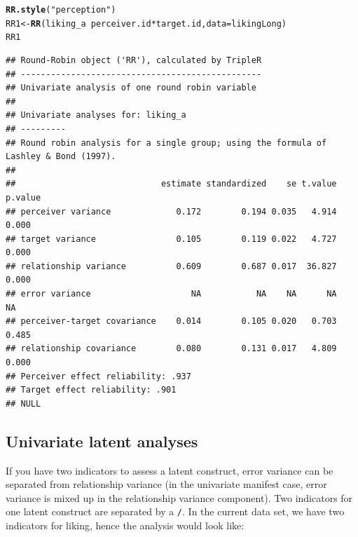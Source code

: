 \documentclass[a4paper]{article}\usepackage[]{graphicx}\usepackage[]{color}
\makeatletter
\newcommand{\hlstr}[1]{\textcolor[rgb]{0.192,0.494,0.8}{#1}}%
\newcommand{\hlopt}[1]{\textcolor[rgb]{0,0,0}{#1}}%
\newcommand{\hlstd}[1]{\textcolor[rgb]{0.345,0.345,0.345}{#1}}%
\newcommand{\hlkwb}[1]{\textcolor[rgb]{0.69,0.353,0.396}{#1}}%
\newcommand{\hlkwc}[1]{\textcolor[rgb]{0.333,0.667,0.333}{#1}}%
\newcommand{\hlkwd}[1]{\textcolor[rgb]{0.737,0.353,0.396}{\textbf{#1}}}%
\newenvironment{kframe}{%
 \def\at@end@of@kframe{}%
 \ifinner\ifhmode%
  \def\at@end@of@kframe{\end{minipage}}%
  \begin{minipage}{\columnwidth}%
 \fi\fi%
 \def\FrameCommand##1{\hskip\@totalleftmargin \hskip-\fboxsep
 \colorbox{shadecolor}{##1}\hskip-\fboxsep
     \hskip-\linewidth \hskip-\@totalleftmargin \hskip\columnwidth}%
 \MakeFramed {\advance\hsize-\width
   \@totalleftmargin\z@ \linewidth\hsize
   \@setminipage}}%
 {\par\unskip\endMakeFramed%
 \at@end@of@kframe}
\newenvironment{knitrout}{}{} %
\makeatother
\begin{document}
\begin{knitrout}\small
{}\color{fgcolor}\begin{kframe}
\begin{alltt}
\hlkwd{RR.style}\hlstd{(}\hlstr{"perception"}\hlstd{)}
\hlstd{RR1} \hlkwb{<-} \hlkwd{RR}\hlstd{(liking_a} \hlopt{~} \hlstd{perceiver.id} \hlopt{*} \hlstd{target.id,} \hlkwc{data} \hlstd{= likingLong)}
\hlstd{RR1}
\end{alltt}
\begin{verbatim}
## Round-Robin object ('RR'), calculated by TripleR
## ------------------------------------------------
## Univariate analysis of one round robin variable
## 
## Univariate analyses for: liking_a 
## ---------
## Round robin analysis for a single group; using the formula of Lashley & Bond (1997).
## 
##                             estimate standardized    se t.value p.value
## perceiver variance             0.172        0.194 0.035   4.914   0.000
## target variance                0.105        0.119 0.022   4.727   0.000
## relationship variance          0.609        0.687 0.017  36.827   0.000
## error variance                    NA           NA    NA      NA      NA
## perceiver-target covariance    0.014        0.105 0.020   0.703   0.485
## relationship covariance        0.080        0.131 0.017   4.809   0.000
## Perceiver effect reliability: .937 
## Target effect reliability: .901 
## NULL
\end{verbatim}
\end{kframe}
\end{knitrout}




\subsection{Univariate latent analyses} %
\label{sub:univariate_latent_analyses}
If you have two indicators to assess a latent construct, error variance can be separated from relationship variance (in the univariate manifest case, error variance is mixed up in the relationship variance component). Two indicators for one latent construct are separated by a \texttt{/}. In the current data set, we have two indicators for liking, hence the analysis would look like:
\end{document}
